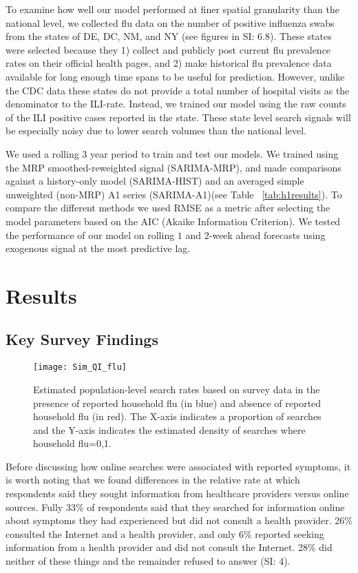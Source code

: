 \documentclass[fleqn,10pt]{wlscirep}
\begin{document}
To examine how well our model performed at finer spatial granularity than the national level, we collected flu data on the number of positive influenza swabs from the states of DE, DC, NM, and NY (see figures in SI: 6.8). These states were selected because they 1) collect and publicly post current flu prevalence rates on their official health pages, and 2) make historical flu prevalence data available for long enough time spans to be useful for prediction. However, unlike the CDC data these states do not provide a total number of hospital visits as the denominator to the ILI-rate. Instead, we trained our model using the raw counts of the ILI positive cases reported in the state. These state level search signals will be especially noisy due to lower search volumes than the national level.

We used a rolling $3$ year period to train and test our models. We trained using the MRP smoothed-reweighted signal (SARIMA-MRP), and made comparisons against a history-only model (SARIMA-HIST) and an averaged simple unweighted (non-MRP) A1 series (SARIMA-A1)(see Table ~\ref{tab:h1results}). To compare the different methods we used RMSE as a metric after selecting the model parameters based on the AIC (Akaike Information Criterion). We tested the performance of our model on rolling $1$ and $2$-week ahead forecasts using exogenous signal at the most predictive lag.

\section*{Results}

\subsection*{Key Survey Findings}

\begin{figure}%
\centering
\texttt{[image: Sim\_QI\_flu]}
\caption{Estimated population-level search rates based on survey data in the presence of reported household flu (in blue) and absence of reported household flu (in red). The X-axis indicates a proportion of searches and the Y-axis indicates the estimated density of searches where household flu=0,1.}
\label{fig:A1search}
\end{figure}

Before discussing how online searches were associated with reported symptoms, it is worth noting that we found differences in the relative rate at which respondents said they sought information from healthcare providers versus online sources. Fully 33\% of respondents said that they searched for information online about symptoms they had experienced but did not consult a health provider. 26\% consulted the Internet and a health provider, and only 6\% reported seeking information from a health provider and did not consult the Internet. 28\% did neither of these things and the remainder refused to answer (SI: 4).
\end{document}
